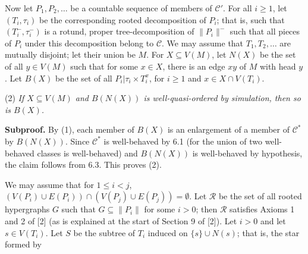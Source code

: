 Now let $P_1, P_2, \ldots$ be a countable sequence of members of $\mathscr{C}'$. For all $i \ge 1$, let $(T_i, \tau_i)$ be the corresponding rooted decomposition of $P_i$; that is, such that $(T_i^-, \tau_i^-)$ is a rotund, proper tree-decomposition of $\|P_i\|^-$ such that all pieces of $P_i$ under this decomposition belong to $\mathscr{C}$. We may assume that $T_1, T_2, \ldots$ are mutually disjoint; let their union be $M$. For $X \subseteq V(M)$, let $N(X)$ be the set of all $y \in V(M)$ such that for some $x \in X$, there is an edge $xy$ of $M$ with head $y$. Let $B(X)$ be the set of all $P_i|\tau_i \times T_i^x$, for $i \ge 1$ and $x \in X \cap V(T_i)$.

\hspace*{12pt}(2) \textit{If $X \subseteq V(M)$ and $B(N(X))$ is well-quasi-ordered by simulation, then so is $B(X)$.}

\textbf{Subproof.} By (1), each member of $B(X)$ is an enlargement of a member of $\mathscr{C}^*$ by $B(N(X))$. Since $\mathscr{C}^*$ is well-behaved by 6.1 (for the union of two well-behaved classes is well-behaved) and $B(N(X))$ is well-behaved by hypothesis, the claim follows from 6.3. This proves (2).

We may assume that for $1 \le i < j$, $(V(P_i) \cup E(P_i)) \cap (V(P_j) \cup E(P_j)) = \emptyset$. Let $\mathscr{R}$ be the set of all rooted hypergraphs $G$ such that $G \subseteq \|P_i\|$ for some $i > 0$; then $\mathscr{R}$ satisfies Axioms 1 and 2 of [2] (as is explained at the start of Section 9 of [2]). Let $i > 0$ and let $s \in V(T_i)$. Let $S$ be the subtree of $T_i$ induced on $\{s\} \cup N(s)$; that is, the star formed by
